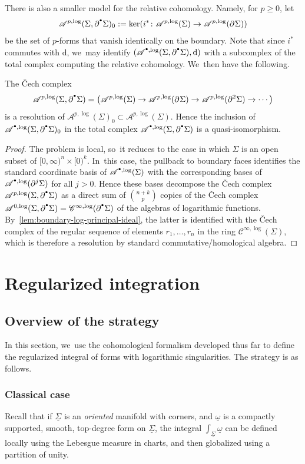 \documentclass[10pt]{amsart}
\let\oldbullet\bullet
\renewcommand{\bullet}{{\raisebox{1pt}{$\scriptscriptstyle\oldbullet$}}}
\theoremstyle{definition}
\theoremstyle{remark}
\newcommand{\halfspc}[1]{[0,\infty)^{#1}}
\renewcommand{\ge}{\geqslant}
\newcommand{\uomega}{\underline{\omega}}
\newcommand{\rbrac}[1]{\left(#1\right)}
\newcommand{\Cinflog}[1]{\mathscr{C}^{\infty,\log}_{#1}}
\newcommand{\dd}{\mathrm{d}}
\newcommand{\Alog}[2][\bullet]{\mathscr{A}^{#1,\log}(#2)}
\newcommand{\Sig}{\Sigma}
\newcommand{\uSig}{\underline{\Sigma}}
\newcommand{\bdSig}[1][]{\partial^{#1}\Sigma}
\begin{document}
There is also a smaller model for the relative cohomology. Namely, for $p \ge 0$, let
\[
\Alog[p]{\Sig,\bdSig[\bullet]}_0 := \ker (i^* \colon \Alog[p]{\Sig} \to \Alog[p]{\bdSig})
\]
be the set of $p$-forms that vanish identically on the boundary. Note that since $i^*$ commutes with $\dd$, we~may identify $(\Alog[\bullet]{\Sig,\bdSig[\bullet]},\dd)$ with a subcomplex of the total complex computing the relative cohomology. We~then have the following.
\begin{lemma}
\label{rem:continuous-relative-cohomology}
The \v{C}ech complex
\[
\Alog[p]{\Sig,\bdSig[\bullet]} = \rbrac{\Alog[p]{\Sig} \to \Alog[p]{\bdSig} \to \Alog[p]{\bdSig[2]} \to \cdots}
\]
is a resolution of $\Alog[p]{\Sig}_0 \subset \Alog[p]{\Sig}$. Hence the inclusion of $\Alog{\Sig,\bdSig[\bullet]}_0$ in the total complex $\Alog{\Sig,\bdSig[\bullet]}$ is a quasi-isomorphism.
\end{lemma}
\begin{proof}
The problem is local, so~it reduces to the case in which $\Sig$ is an open subset of $\halfspc{n}\times[0)^k$. In~this case, the pullback to boundary faces identifies the standard coordinate basis of $\Alog{\Sig}$ with the corresponding bases of $\Alog{\bdSig[j]}$ for all $j > 0$. Hence these bases decompose the \v{C}ech complex $\Alog[p]{\Sig,\bdSig[\bullet]}$ as a direct sum of $\binom{n+k}{p}$ copies of the \v{C}ech complex $\Alog[0]{\Sig,\bdSig[\bullet]} = \Cinflog{}(\bdSig[\bullet])$ of the algebras of logarithmic functions. By~\autoref{lem:boundary-log-principal-ideal}, the latter is identified with the \v{C}ech complex of the regular sequence of elements $r_1,\ldots,r_n$ in the ring $\Cinflog{}(\Sig)$, which is therefore a resolution by standard commutative/homological algebra.
\end{proof}

\section{Regularized integration}
\label{sec:integration}

\subsection{Overview of the strategy}
In this section, we~use the cohomological formalism developed thus far to define the regularized integral of forms with logarithmic singularities. The strategy is as follows.

\subsubsection{Classical case}\label{sec:classical-integral} Recall that if $\uSig$ is an \emph{oriented} manifold with corners, and $\uomega$ is a compactly supported, smooth, top-degree form on $\uSig$, the integral $\int_{\uSig} \uomega$ can be defined locally using the Lebesgue measure in charts, and then globalized using a partition of unity.
\end{document}
